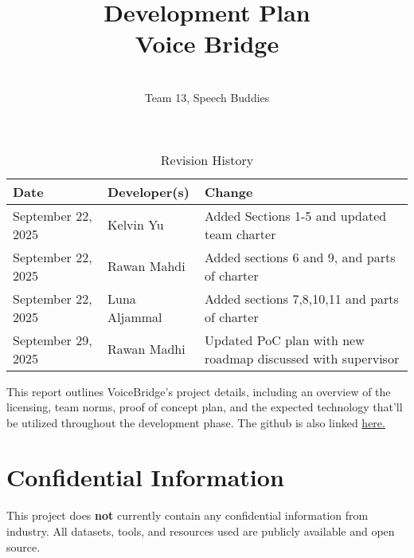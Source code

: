 \documentclass{article}
\title{Development Plan\\ Voice Bridge}
\author{\\ Team 13, Speech Buddies}
\date{}
\begin{document}
\maketitle

\begin{table}[hp]
\caption{Revision History} \label{TblRevisionHistory}
\begin{tabularx}{\textwidth}{llX}
\toprule
\textbf{Date} & \textbf{Developer(s)} & \textbf{Change}\\
\midrule
September 22, 2025 & Kelvin Yu & Added Sections 1-5 and updated team charter\\
September 22, 2025 & Rawan Mahdi & Added sections 6 and 9, and parts of charter \\
September 22, 2025 & Luna Aljammal & Added sections 7,8,10,11 and parts of charter \\
September 29, 2025 & Rawan Madhi & Updated PoC plan with new roadmap discussed with supervisor\\
\bottomrule
\end{tabularx}
\end{table}

\newpage{}

\begin{comment}\wss{Put your introductory blurb here.  Often the blurb is a brief roadmap of
what is contained in the report.}
\end{comment}

This report outlines VoiceBridge’s project details, including an overview of the licensing, team norms, proof of concept plan, and the expected technology that’ll be utilized throughout the development phase. 
The github is also linked \href{https://github.com/speech-buddies/VoiceBridge}{here.} 

\begin{comment}\wss{Additional information on the development plan can be found in the
\href{https://gitlab.cas.mcmaster.ca/courses/capstone/-/blob/main/Lectures/L02b_POCAndDevPlan/POCAndDevPlan.pdf?ref_type=heads}
{lecture slides}.}
\end{comment}



\section{Confidential Information}

This project does \textbf{not} currently contain any confidential information from industry. All datasets, tools, and resources used are publicly available and open source.
\end{document}
